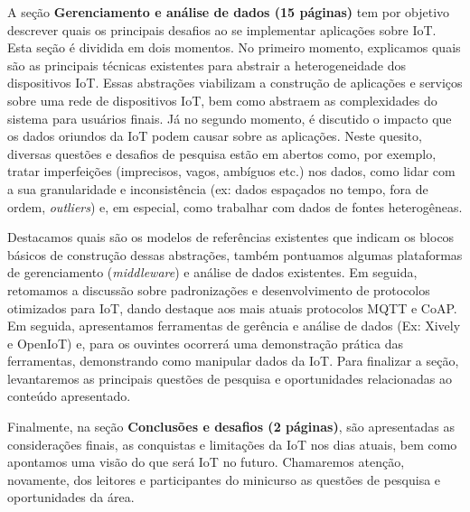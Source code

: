 \documentclass{SBCbookchapter}
\begin{document}
A seção \textbf{Gerenciamento e análise de dados (15 páginas)} tem por objetivo 
descrever quais os principais desafios ao se implementar aplicações sobre IoT. 
Esta seção é dividida em dois momentos. No primeiro momento, explicamos quais 
são as principais técnicas existentes para abstrair a heterogeneidade dos 
dispositivos IoT. Essas abstrações viabilizam a construção de aplicações e 
serviços sobre uma rede de dispositivos IoT, bem como abstraem as complexidades 
do sistema para usuários finais. Já no segundo momento, é discutido o impacto 
que os dados oriundos da IoT podem causar sobre as aplicações. Neste quesito, 
diversas questões e desafios de pesquisa estão em abertos como, por exemplo, 
tratar imperfeições (imprecisos, vagos, ambíguos etc.) nos dados, como lidar com 
a sua granularidade e inconsistência (ex: dados espaçados no tempo, fora de 
ordem, \textit{outliers}) e, em especial, como trabalhar com dados de fontes 
heterogêneas.

Destacamos quais são os modelos de referências existentes que indicam os 
blocos básicos de construção dessas abstrações, também pontuamos algumas 
plataformas de gerenciamento (\textit{middleware}) e análise de dados 
existentes. Em seguida, retomamos a discussão sobre padronizações e 
desenvolvimento de protocolos otimizados para IoT, dando destaque aos mais 
atuais protocolos MQTT e CoAP. Em seguida, apresentamos ferramentas de gerência 
e análise de dados (Ex: Xively e OpenIoT) e, para os ouvintes ocorrerá uma 
demonstração prática das ferramentas, demonstrando como manipular dados da IoT. 
Para finalizar a seção, levantaremos as principais questões de pesquisa e 
oportunidades relacionadas ao conteúdo apresentado.

Finalmente, na seção \textbf{Conclusões e desafios (2 páginas)}, 
são apresentadas as considerações finais, as conquistas e limitações da IoT nos 
dias atuais, bem como apontamos uma visão do que será IoT no futuro. Chamaremos 
atenção, novamente, dos leitores e participantes do minicurso as questões de 
pesquisa e oportunidades da área.


\end{document}
